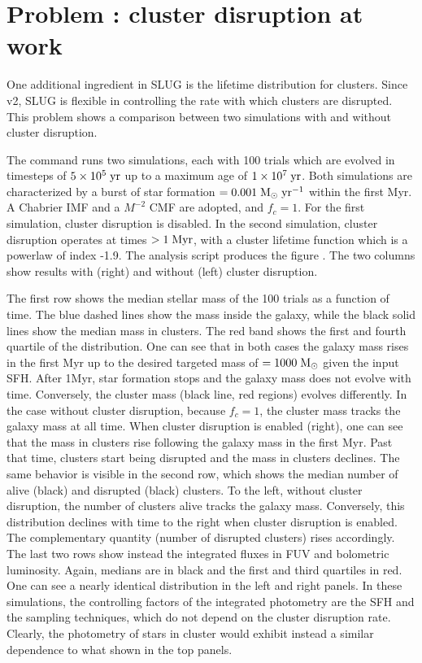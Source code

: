 \documentclass[letterpaper,10pt,english]{sphinxmanual}
\begin{document}
\section{Problem : cluster disruption at work}
\label{\detokenize{tests:problem-cldisrupt-cluster-disruption-at-work}}
One additional ingredient in SLUG is the lifetime distribution for clusters. Since v2, SLUG is flexible in
controlling the rate with which clusters are disrupted. This problem shows a comparison between
two simulations with and without cluster disruption.

The command   runs two  simulations, each with 100 trials
which are evolved in timesteps of  \(5\times 10^5\rm\;yr\) up to a maximum age of
\(1\times 10^7\rm\;yr\). Both simulations are characterized by a burst of star formation
\(=0.001\rm\;M_\odot\;yr^{-1}\) within the first Myr. A Chabrier IMF and a \(M^{-2}\)
CMF are adopted, and \(f_c = 1\). For the first simulation, cluster disruption is
disabled. In the second simulation, cluster disruption operates at times \(>1\rm\;Myr\),
with a cluster lifetime function which is a powerlaw of index -1.9.
The analysis script  produces the figure .
The two columns show results with (right) and without (left) cluster disruption.

The first row shows the median stellar mass of the 100 trials as a function of time.
The blue dashed lines show the mass inside the galaxy, while the black solid lines show the
median mass in clusters. The red band shows the first and fourth quartile of the distribution.
One can see that in both cases the galaxy mass rises in the first Myr up to the desired
targeted mass of \(=1000\rm\;M_\odot\) given the input SFH. After 1Myr, star formation
stops and the galaxy mass does not evolve with time. Conversely, the cluster mass (black line, red
regions) evolves differently. In the case without cluster disruption, because \(f_c = 1\),
the cluster mass tracks the galaxy mass at all time. When cluster disruption is enabled (right),
one can see that the mass in clusters rise following the galaxy mass in the first Myr. Past that time,
clusters start being disrupted and the mass in clusters declines.
The same behavior is visible in the second row, which shows the median number of alive (black) and
disrupted (black) clusters. To the left, without cluster disruption, the number of clusters alive
tracks the galaxy mass. Conversely, this distribution declines with time to the right when cluster disruption is
enabled. The complementary quantity (number of disrupted clusters) rises accordingly.
The last two rows show instead the integrated fluxes in FUV and bolometric luminosity.
Again, medians are in black and the first and third quartiles in red. One can see a nearly identical distribution
in the left and right panels. In these simulations, the controlling factors of the integrated photometry
are the SFH and the sampling techniques, which do not depend on the cluster disruption rate. Clearly, the
photometry of stars in cluster would exhibit instead a similar dependence to what shown in the top panels.
\end{document}
